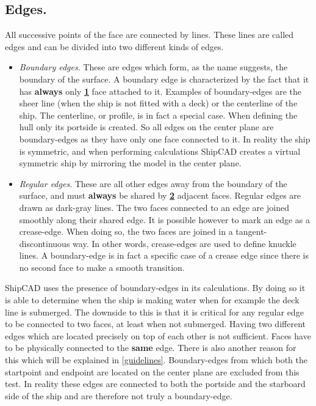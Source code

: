\documentclass[12pt]{article}
\begin{document}
\subsection{Edges.}
All successive points of the face are connected by lines. These lines
are called edges and can be divided into two different kinds of edges.

\begin{itemize}

  \item \textit{Boundary edges}. These are edges which form, as the
  name suggests, the boundary of the surface. A boundary edge is
  characterized by the fact that it has \textbf{always}
  only \underline{\textbf{1}} face attached to it. Examples of
  boundary-edges are the sheer line (when the ship is not fitted with
  a deck) or the centerline of the ship. The centerline, or profile,
  is in fact a special case.  When defining the hull only its portside
  is created. So all edges on the center plane are boundary-edges as
  they have only one face connected to it. In reality the ship is
  symmetric, and when performing calculations ShipCAD creates a
  virtual symmetric ship by mirroring the model in the center plane.

  \item \textit{Regular edges}. These are all other edges away from
  the boundary of the surface, and must \textbf{always} be shared
  by \underline{\textbf{2}} adjacent faces. Regular edges are drawn as
  dark-gray lines. The two faces connected to an edge are joined
  smoothly along their shared edge. It is possible however to mark an
  edge as a crease-edge. When doing so, the two faces are joined in a
  tangent-discontinuous way. In other words, crease-edges are used to
  define knuckle lines. A boundary-edge is in fact a specific case of
  a crease edge since there is no second face to make a smooth
  transition.

\end{itemize}

ShipCAD uses the presence of boundary-edges in its calculations. By
doing so it is able to determine when the ship is making water when
for example the deck line is submerged. The downside to this is that
it is critical for any regular edge to be connected to two faces, at
least when not submerged. Having two different edges which are located
precisely on top of each other is not sufficient. Faces have to be
physically connected to the \textbf{same} edge. There is also another
reason for this which will be explained
in \ref{guidelines}. Boundary-edges from which both the startpoint and
endpoint are located on the center plane are excluded from this test.
In reality these edges are connected to both the portside and the
starboard side of the ship and are therefore not truly a
boundary-edge.
\end{document}
